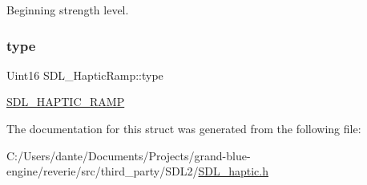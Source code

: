 Beginning strength level. \mbox{\label{struct_s_d_l___haptic_ramp_aca1c2349372433822ab62f60976640aa}} 
\subsubsection{\texorpdfstring{type}{type}}
{\footnotesize\ttfamily Uint16 S\+D\+L\+\_\+\+Haptic\+Ramp\+::type}

\mbox{\hyperlink{_s_d_l__haptic_8h_af10eb937a64a8f602e9c46682ac0d868}{S\+D\+L\+\_\+\+H\+A\+P\+T\+I\+C\+\_\+\+R\+A\+MP}} 

The documentation for this struct was generated from the following file\+:\begin{DoxyCompactItemize}
\item 
C\+:/\+Users/dante/\+Documents/\+Projects/grand-\/blue-\/engine/reverie/src/third\+\_\+party/\+S\+D\+L2/\mbox{\hyperlink{_s_d_l__haptic_8h}{S\+D\+L\+\_\+haptic.\+h}}\end{DoxyCompactItemize}
